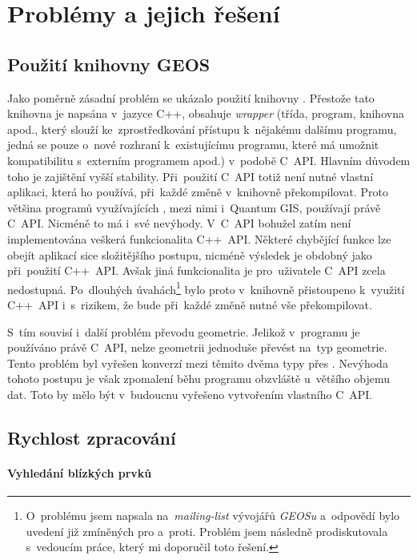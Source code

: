 \chapter{Problémy a jejich řešení}
\label{7-problemy}

\section{Použití knihovny GEOS}
\label{problemy-geos}
Jako poměrně zásadní problém se ukázalo použití knihovny . 
Přestože tato knihovna je napsána v~jazyce C++, obsahuje 
\textit{wrapper} (třída, program, knihovna apod., který slouží 
ke~zprostředkování přístupu k~nějakému dalšímu programu, jedná se pouze 
o~nové rozhraní k~existujícímu programu, které má umožnit kompatibilitu
s~externím programem apod.) v~podobě C~API. Hlavním důvodem toho je 
zajištění vyšší stability. Při~použití C~API totiž není nutné vlastní 
aplikaci, která ho používá, při~každé změně v~knihovně  překompilovat. 
Proto většina programů využívajících , mezi nimi i~Quantum 
GIS, používají právě C~API. Nicméně to má i~své nevýhody. V~C~API bohužel 
zatím není implementována veškerá funkcionalita C++~API. Některé chybějící 
funkce lze obejít aplikací sice složitějšího postupu, nicméně výsledek je 
obdobný jako při~použití C++~API. Avšak jiná funkcionalita je pro~uživatele 
C~API zcela nedostupná. Po~dlouhých úvahách\footnote{O~problému jsem napsala
na~\textit{mailing-list} vývojářů \textit{GEOSu} a~odpovědí bylo uvedení 
již zmíněných pro a~proti. Problém jsem následně prodiskutovala s~vedoucím 
práce, který mi doporučil toto řešení.} bylo proto v~knihovně  
přistoupeno k~využití C++~API i~s~rizikem, že bude při~každé změně nutné 
vše překompilovat. 

S~tím souvisí i~další problém převodu geometrie. Jelikož v~programu  
je používáno právě C~API, nelze  geometrii jednoduše převést na~typ 
 geometrie. Tento pro\-blém byl vyřešen konverzí mezi těmito dvěma
typy přes . Nevýhoda tohoto postupu je však zpomalení běhu programu 
obzvláště u~většího objemu dat. Toto by mělo být v~budoucnu vyřešeno 
vytvořením vlastního C~API.


\section{Rychlost zpracování}
\label{problemy-rychlost}

\subsubsection{Vyhledání blízkých prvků}

